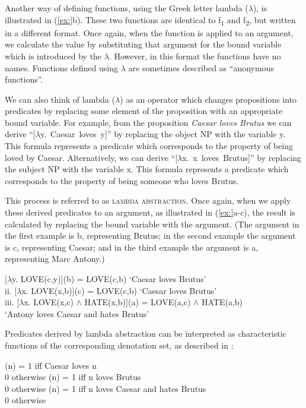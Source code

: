 Another way of defining functions, using the Greek letter lambda ($\lambda $), is illustrated in (\ref{ex:}b). These two functions are identical to f\textsubscript{1} and f\textsubscript{2}, but written in a different format. Once again, when the function is applied to an argument, we calculate the value by substituting that argument for the bound variable which is introduced by the $\lambda $. However, in this format the functions have no names. Functions defined using $\lambda $ are sometimes described as “anonymous functions”.



We can also think of lambda ($\lambda $) as an operator which changes propositions into predicates by replacing some element of the proposition with an appropriate bound variable. For example, from the proposition \textit{Caesar loves Brutus} we can derive “[$\lambda $y.~Caesar~loves~y]” by replacing the object NP with the variable y. This formula represents a predicate which corresponds to the property of being loved by Caesar. Alternatively, we can derive “[$\lambda $x.~x~loves~Brutus]” by replacing the subject NP with the variable x. This formula represents a predicate which corresponds to the property of being someone who loves Brutus.



This process is referred to as \textsc{lambda abstraction}. Once again, when we apply these derived predicates to an argument, as illustrated in (\ref{ex:}a-c), the result is calculated by replacing the bound variable with the argument. (The argument in the first example is b, representing Brutus; in the second example the argument is c, representing Caesar; and in the third example the argument is a, representing Marc Antony.)


\ea
\ex{} [$\lambda $y. LOVE(c,y)](b) = LOVE(c,b) ‘Caesar loves Brutus’\\
ii. [$\lambda $x. LOVE(x,b)](c) = LOVE(c,b) ‘Caesar loves Brutus’\\
iii. [$\lambda $x. LOVE(x,c) $\wedge$ HATE(x,b)](a) = LOVE(a,c) $\wedge$ HATE(a,b)\\
  ‘Antony loves Caesar and hates Brutus’
\z


Predicates derived by lambda abstraction can be interpreted as characteristic functions of the corresponding denotation set, as described in :


\ea {}(n) =  1 iff Caesar loves n\\
  0 otherwise
(n) =  1 iff n loves Brutus\\
  0 otherwise
(n) =  1 iff n loves Caesar and hates Brutus\\
  0 otherwise
\z \z


